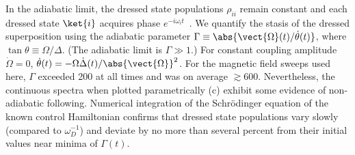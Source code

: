 In the adiabatic limit, the dressed state populations $\rho_{ii}$ remain constant and each dressed state $\ket{i}$ acquires phase $e^{-i \omega_i t}$~\cite{messiah_quantum_1962}. 
We quantify the stasis of the dressed superposition using the adiabatic parameter $\Gamma \equiv \abs{\vect{\Omega}(t)/\dot{\theta}(t)}$, where $\tan \theta \equiv \Omega / \Delta$.
(The adiabatic limit is $\Gamma\gg 1$.)
For constant coupling amplitude $\dot{\Omega} = 0$, $\dot{\theta}(t) = -\Omega \dot{\Delta}(t)/\abs{\vect{\Omega}}^2$.
For the magnetic field sweeps used here, $\Gamma$ exceeded 200 at all times and was on average $\gtrsim 600$.
Nevertheless, the continuous spectra when plotted parametrically (c) exhibit some evidence of non-adiabatic following.
Numerical integration of the Schr\"{o}dinger equation of the known control Hamiltonian confirms that dressed state populations vary slowly (compared to $\omega_D^{-1}$) and deviate by no more than several percent from their initial values near minima of $\Gamma(t)$.